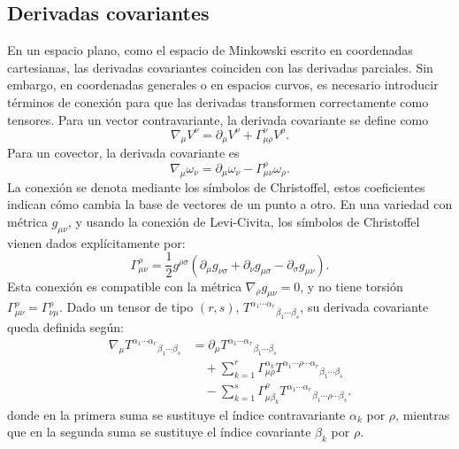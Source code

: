 \documentclass[a4paper,11pt]{book} %
\begin{document}
\subsection*{Derivadas covariantes}
\noindent
En un espacio plano, como el espacio de Minkowski escrito en coordenadas
cartesianas, las derivadas covariantes coinciden con las derivadas parciales.
Sin embargo, en coordenadas generales o en espacios curvos, es necesario
introducir términos de conexión para que las derivadas transformen
correctamente como tensores.
\medskip\newline
Para un vector contravariante, la derivada covariante se define como
\begin{equation}
    \nabla_\mu V^\nu
    =
    \partial_\mu V^\nu
    +
    \Gamma^\nu_{\mu\rho}V^\rho.
\end{equation}
\noindent
Para un covector, la derivada covariante es
\begin{equation}
    \nabla_\mu \omega_\nu
    =
    \partial_\mu \omega_\nu
    -
    \Gamma^\rho_{\mu\nu}\omega_\rho.
\end{equation}
\noindent
La conexión se denota mediante los símbolos de Christoffel, estos coeficientes indican cómo cambia la base de vectores de un punto a otro. En una variedad con métrica \(g_{\mu\nu}\), y usando la conexión de Levi-Civita, los símbolos de Christoffel vienen dados explícitamente por:
\begin{equation}
    \Gamma^\rho_{\mu\nu}
    =
    \frac{1}{2}g^{\rho\sigma}
    \left(
        \partial_\mu g_{\nu\sigma}
        +
        \partial_\nu g_{\mu\sigma}
        -
        \partial_\sigma g_{\mu\nu}
    \right).
\end{equation}
\noindent
Esta conexión es compatible con la métrica $\nabla_\rho g_{\mu\nu} = 0$, y no tiene torsión $\Gamma^\rho_{\mu\nu} = \Gamma^\rho_{\nu\mu}$.
\medskip\newline
Dado un tensor de tipo \((r,s)\), $T^{\alpha_1\cdots\alpha_r}{}_{\beta_1\cdots\beta_s}$, su derivada covariante queda definida según:
\begin{equation}
\begin{aligned}
    \nabla_\mu
    T^{\alpha_1\cdots\alpha_r}{}_{\beta_1\cdots\beta_s}
    &=
    \partial_\mu
    T^{\alpha_1\cdots\alpha_r}{}_{\beta_1\cdots\beta_s}
    \\
    &\quad
    +
    \sum_{k=1}^{r}
    \Gamma^{\alpha_k}_{\mu\rho}
    T^{\alpha_1\cdots \rho \cdots \alpha_r}{}_{\beta_1\cdots\beta_s}
    \\
    &\quad
    -
    \sum_{k=1}^{s}
    \Gamma^\rho_{\mu\beta_k}
    T^{\alpha_1\cdots\alpha_r}{}_{\beta_1\cdots \rho \cdots \beta_s}.
\end{aligned}
\end{equation}
donde en la primera suma se sustituye el índice contravariante
\(\alpha_k\) por \(\rho\), mientras que en la segunda suma se sustituye el
índice covariante \(\beta_k\) por \(\rho\).
\end{document}
